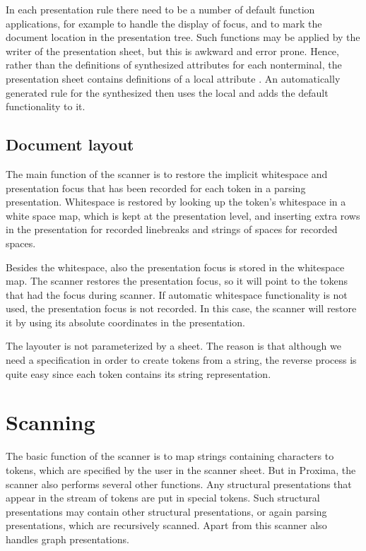 \documentclass[12pt]{article}
\begin{document}
In each presentation rule there need to be a number of default function applications, for example to handle the display of focus, and to mark the document location in the presentation tree. Such functions may be applied by the writer of the presentation sheet, but this is awkward and error prone. Hence, rather than the definitions of synthesized attributes  for each nonterminal, the presentation sheet contains definitions of a local attribute . An automatically generated rule for the synthesized  then uses the local  and adds the default functionality to it.

\subsection{Document layout}

The main function of the scanner is to restore the implicit whitespace and presentation focus that has been recorded for each token in a parsing presentation. Whitespace is restored by looking up the token's whitespace in a white space map, which is kept at the presentation level, and inserting extra rows in the presentation for recorded linebreaks and strings of spaces for recorded spaces. 

Besides the whitespace, also the presentation focus is stored in the whitespace map. The scanner restores the presentation focus, so it will point to the tokens that had the focus during scanner. If automatic whitespace functionality is not used, the presentation focus is not recorded. In this case, the scanner will restore it by using its absolute coordinates in the presentation.

The layouter is not parameterized by a sheet. The reason is that although we need a specification in order to create tokens from a string, the reverse process is quite easy since each token contains its string representation.  





%
\section{Scanning}\label{sect:scanner}
%

The basic function of the scanner is to map strings containing characters to tokens, which are specified by the user in the scanner sheet. But in Proxima, the scanner also performs several other functions. Any structural presentations that appear in the stream of tokens are put in special tokens. Such structural presentations may contain other structural presentations, or again parsing presentations, which are recursively scanned. Apart from this scanner also handles graph presentations. 
\end{document}
